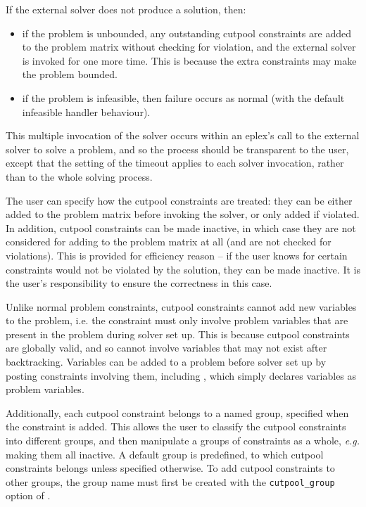 If the external solver does not produce a solution, then:
\begin{itemize}
\item if the problem is unbounded, any outstanding cutpool constraints are
added to the problem matrix without checking for violation,  and the
external solver is invoked for one more time. This is because the extra
constraints may make the problem bounded. 
\item if the problem is infeasible, then failure occurs as normal (with the
default infeasible handler behaviour). 
\end{itemize}

This multiple invocation of the solver occurs within an eplex's call to the
external solver to solve a problem, and so the process should be
transparent to the user, except that the setting of the timeout applies to
each solver invocation, rather than to the whole solving process.

The user can specify how the cutpool constraints are treated: they can be
either added to the problem matrix before invoking the solver, or only
added if violated. In addition, cutpool constraints
can be made inactive, in which case they are not considered for adding to
the problem matrix at all (and are not checked for violations). This is
provided for efficiency reason -- if the user knows for certain
constraints would not be violated by the solution, they can be made
inactive. It is the user's responsibility to ensure the correctness in this
case. 

Unlike normal problem constraints, cutpool constraints cannot add new
variables to the problem, i.e. the constraint must only involve problem
variables that are present in the problem during solver set up. This is
because cutpool constraints are globally valid, and so cannot involve
variables that may not exist after backtracking. Variables can be added to
a problem before solver set up by posting constraints involving them,
including , which simply
declares variables as problem variables. 

Additionally, each cutpool constraint belongs to a named
group, specified when the constraint is added.  This allows the user to
classify the cutpool constraints into different groups, and then
manipulate a groups of constraints as a whole, {\it e.g.\/} making them all
inactive. A default group is predefined, to which cutpool constraints
belongs unless specified otherwise. To add cutpool constraints to other
groups, the group name must first be created with the
{\tt cutpool_group} option of
.

